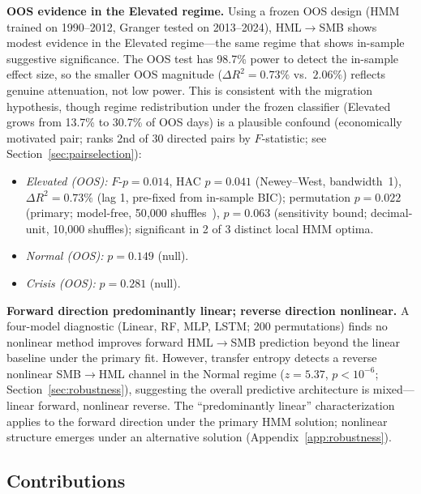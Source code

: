 \documentclass[sigconf,anonymous]{acmart}
\begin{document}
\textbf{OOS evidence in the Elevated regime.}
Using a frozen OOS design (HMM trained on 1990--2012, Granger tested on
2013--2024), HML$\to$SMB shows modest evidence in the Elevated regime---the
same regime that shows in-sample suggestive significance. The OOS test has
98.7\% power to detect the in-sample effect size, so the smaller OOS magnitude
($\Delta R^2 = 0.73\%$ vs.\ $2.06\%$) reflects genuine attenuation, not low power.
This is consistent with the migration hypothesis, though regime redistribution
under the frozen classifier (Elevated grows from 13.7\% to 30.7\% of OOS days)
is a plausible confound
(economically motivated pair; ranks 2nd of 30 directed pairs by $F$-statistic;
see Section~\ref{sec:pairselection}):
\begin{itemize}
    \item \emph{Elevated (OOS):} $F$-$p = 0.014$, HAC $p = 0.041$ (Newey--West, bandwidth~1),
    $\Delta R^2 = 0.73\%$ (lag 1, pre-fixed from in-sample BIC); permutation
    $p = 0.022$ (primary; model-free, 50{,}000 shuffles~\cite{good2005permutation}),
    $p = 0.063$ (sensitivity bound; decimal-unit, 10{,}000 shuffles);
    significant in 2 of 3 distinct local HMM optima.
    \item \emph{Normal (OOS):} $p = 0.149$ (null).
    \item \emph{Crisis (OOS):} $p = 0.281$ (null).
\end{itemize}

\textbf{Forward direction predominantly linear; reverse direction nonlinear.}
A four-model diagnostic (Linear, RF, MLP, LSTM; 200 permutations) finds
no nonlinear method improves forward HML$\to$SMB prediction beyond the linear
baseline under the primary fit. However, transfer entropy detects a
reverse nonlinear SMB$\to$HML channel in the Normal regime ($z = 5.37$,
$p < 10^{-6}$; Section~\ref{sec:robustness}), suggesting the overall
predictive architecture is mixed---linear forward, nonlinear reverse.
The ``predominantly linear'' characterization applies to the forward direction
under the primary HMM solution; nonlinear structure emerges under an
alternative solution (Appendix~\ref{app:robustness}).

\subsection{Contributions}
\end{document}
